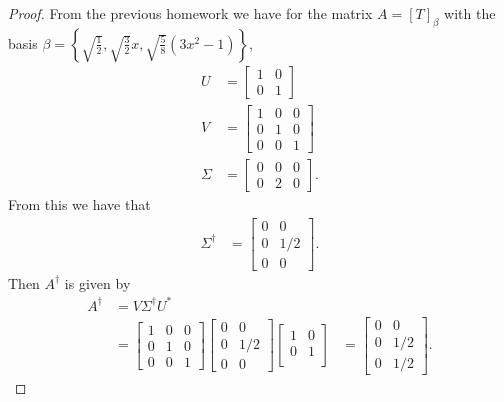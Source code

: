 \documentclass[leqno]{article}
\theoremstyle{nonumberplain}
\newtheorem{proof}{Proof}
\begin{document}
\begin{proof}
From the previous homework we have for the matrix $A=[T]_\beta$ with the basis $\beta=\left\{ \sqrt{\frac{1}{2}}, \sqrt{\frac{3}{2}}x, \sqrt{\frac{5}{8}}(3x^2-1)\right\}$,
\begin{align*}
U&= 
\begin{bmatrix}
1 & 0\\
0 & 1
\end{bmatrix}\\
V&=
\begin{bmatrix}
1 & 0 & 0\\
0 & 1 & 0\\
0 & 0 & 1
\end{bmatrix}\\
\Sigma &=
\begin{bmatrix}
0 & 0 & 0\\
0 & 2 & 0
\end{bmatrix}.
\end{align*}
From this we have that 
\begin{align*}
\Sigma^\dagger &=
\begin{bmatrix}
0 & 0\\
0 & 1/2\\
0 & 0
\end{bmatrix}.
\end{align*}
Then $A^\dagger$ is given by
\begin{align*}
A^\dagger &= V\Sigma^\dagger U^*\\
&= \begin{bmatrix}
1 & 0 & 0\\
0 & 1 & 0\\
0 & 0 & 1
\end{bmatrix}
\begin{bmatrix}
0 & 0\\
0 & 1/2\\
0 & 0
\end{bmatrix}
\begin{bmatrix}
1 & 0\\
0 & 1\\
\end{bmatrix}
&=
\begin{bmatrix}
0 & 0\\
0 & 1/2\\
0 & 1/2
\end{bmatrix}.
\end{align*}
\end{proof}



\pagebreak
\end{document}
